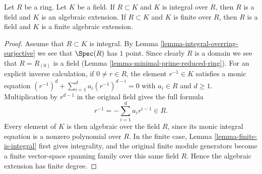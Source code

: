 \begin{lemma}
\label{lemma-integral-under-field}
Let $R$ be a ring. Let $K$ be a field.
If $R \subset K$ and $K$ is integral over $R$,
then $R$ is a field and $K$ is an algebraic extension.
If $R \subset K$ and $K$ is finite over $R$,
then $R$ is a field and $K$ is a finite algebraic extension.
\end{lemma}

\begin{proof}
Assume that $R \subset K$ is integral.
By Lemma \ref{lemma-integral-overring-surjective} we see that
$\Spec(R)$ has $1$ point. Since clearly $R$ is a domain we see
that $R = R_{(0)}$ is a field (Lemma \ref{lemma-minimal-prime-reduced-ring}).
For an explicit inverse calculation, if $0\ne r\in R$, the
element $r^{-1}\in K$ satisfies a monic equation
$(r^{-1})^d+\sum_{i=1}^d a_i(r^{-1})^{d-i}=0$ with $a_i\in R$
and $d\geq1$. Multiplication by $r^{d-1}$ in the original field
gives the full formula
$$
r^{-1}=-\sum_{i=1}^d a_i r^{i-1}\in R.
$$
Every element of $K$ is then algebraic over the field $R$, since
its monic integral equation is a nonzero polynomial over $R$.
In the finite case, Lemma \ref{lemma-finite-is-integral} first
gives integrality, and the original finite module generators
become a finite vector-space spanning family over this same field
$R$. Hence the algebraic extension has finite degree.
\end{proof}